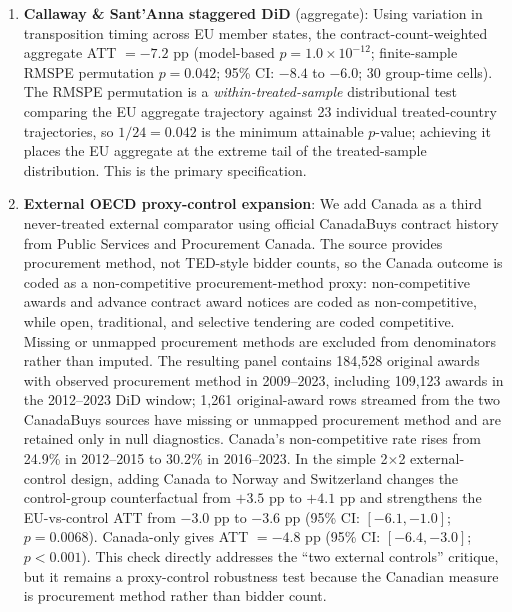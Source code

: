 \documentclass[11pt]{article}
\begin{document}
\begin{enumerate}
\item \textbf{Callaway \& Sant'Anna staggered DiD} (aggregate): Using variation in transposition timing across EU member states, the contract-count-weighted aggregate ATT $= -7.2$ pp (model-based $p = 1.0 \times 10^{-12}$; finite-sample RMSPE permutation $p = 0.042$; 95\% CI: $-8.4$ to $-6.0$; 30 group-time cells). The RMSPE permutation is a \emph{within-treated-sample} distributional test comparing the EU aggregate trajectory against 23 individual treated-country trajectories, so $1/24 = 0.042$ is the minimum attainable $p$-value; achieving it places the EU aggregate at the extreme tail of the treated-sample distribution. This is the primary specification.
\item \textbf{External OECD proxy-control expansion}: We add Canada as a third never-treated external comparator using official CanadaBuys contract history from Public Services and Procurement Canada. The source provides procurement method, not TED-style bidder counts, so the Canada outcome is coded as a non-competitive procurement-method proxy: non-competitive awards and advance contract award notices are coded as non-competitive, while open, traditional, and selective tendering are coded competitive. Missing or unmapped procurement methods are excluded from denominators rather than imputed. The resulting panel contains 184,528 original awards with observed procurement method in 2009--2023, including 109,123 awards in the 2012--2023 DiD window; 1,261 original-award rows streamed from the two CanadaBuys sources have missing or unmapped procurement method and are retained only in null diagnostics. Canada's non-competitive rate rises from 24.9\% in 2012--2015 to 30.2\% in 2016--2023. In the simple 2$\times$2 external-control design, adding Canada to Norway and Switzerland changes the control-group counterfactual from $+3.5$ pp to $+4.1$ pp and strengthens the EU-vs-control ATT from $-3.0$ pp to $-3.6$ pp (95\% CI: $[-6.1,-1.0]$; $p = 0.0068$). Canada-only gives ATT $= -4.8$ pp (95\% CI: $[-6.4,-3.0]$; $p < 0.001$). This check directly addresses the ``two external controls'' critique, but it remains a proxy-control robustness test because the Canadian measure is procurement method rather than bidder count.


\end{enumerate}
\end{document}
